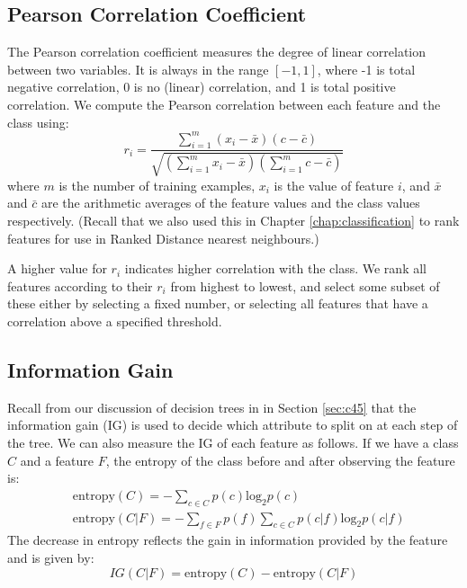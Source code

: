 \subsection{Pearson Correlation Coefficient}
The Pearson correlation coefficient measures the degree of linear correlation
between two variables. It is always in the range $[-1,1]$, where -1 is total
negative correlation, 0 is no (linear) correlation, and 1 is total positive
correlation. We compute the Pearson correlation between each feature and the
class using:
\begin{equation*}
r_i = \dfrac{\sum_{i=1}^m (x_i-\bar{x})(c-\bar{c})}{\sqrt{(\sum_{i=1}^m x_i-\bar{x})(\sum_{i=1}^m c-\bar{c})}}
\end{equation*}
where $m$ is the number of training examples, $x_i$ is the value of feature
$i$, and $\bar{x}$ and $\bar{c}$ are the arithmetic averages of the feature
values and the class values respectively. (Recall that we also used this
in Chapter \ref{chap:classification} to rank features for use in Ranked
Distance nearest neighbours.) 

A higher value for $r_i$ indicates higher correlation with the class. We
rank all features according to their $r_i$ from highest to lowest, and select
some subset of these either by selecting a fixed number, or selecting all
features that have a correlation above a specified threshold.

\subsection{Information Gain}
Recall from our discussion of decision trees in in Section \ref{sec:c45} that
the information gain (IG) is used to decide which attribute to split on at each
step of the tree. We can also measure the IG of each feature as follows.
If we have a class $C$ and a feature $F$, the entropy of the
class before and after observing the feature is:
\begin{equation*}
\begin{aligned}
& \mathrm{entropy}(C) = - \sum_{c \in C} p(c) \mathrm{log}_2 p(c) \\
& \mathrm{entropy}(C|F) = - \sum_{f \in F} p(f) \sum_{c \in C} p(c|f) \mathrm{log}_2 p(c|f)
\end{aligned}
\end{equation*}
The decrease in entropy reflects the gain in information provided by the
feature and is given by:
\begin{equation*}
IG(C|F) = \mathrm{entropy}(C) - \mathrm{entropy}(C|F)
\end{equation*}

